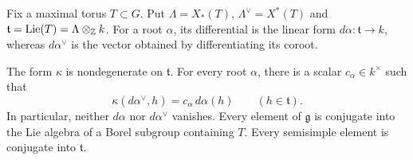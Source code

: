 Fix a maximal torus $T\subset G$.  Put
$\Lambda=X_*(T)$, $\Lambda^\vee=X^*(T)$ and
$\mathfrak t=\operatorname{Lie}(T)=\Lambda\otimes_{\mathbb Z}k$.
For a root $\alpha$, its differential is the linear form
$d\alpha:\mathfrak t\to k$, whereas $d\alpha^\vee$ is the vector
obtained by differentiating its coroot.

\begin{lemma}\label{lie:root-pairing}
The form $\kappa$ is nondegenerate on $\mathfrak t$.  For every root
$\alpha$, there is a scalar $c_\alpha\in k^\times$ such that
\begin{equation}\label{eq:root-coroot-pairing}
 \kappa(d\alpha^\vee,h)=c_\alpha\,d\alpha(h)
 \qquad(h\in\mathfrak t).
\end{equation}
In particular, neither $d\alpha$ nor $d\alpha^\vee$ vanishes.
Every element of $\mathfrak g$ is conjugate into the Lie algebra of a
Borel subgroup containing $T$.  Every semisimple element is conjugate
into $\mathfrak t$.
\end{lemma}

